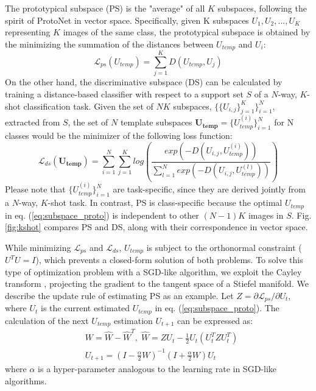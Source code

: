 The prototypical subspace (PS) is the "average" of all $K$ subspaces, following the spirit of ProtoNet \cite{snell2017prototypical} in vector space.
Specifically, given K subspaces $U_1,U_2,...,U_K$ representing $K$ images of the same class, the prototypical subspace is obtained by the minimizing the summation of the distances between $U_{temp}$ and $U_i$:
\begin{equation}
    \mathcal{L}_{ps}(U_{temp}) = \sum_{j=1}^K D(U_{temp},U_j)
\label{eq:subspace_proto}
\end{equation}
On the other hand, the discriminative subspace (DS) can be calculated by training a distance-based classifier with respect to a support set $S$ of a $N$-way, $K$-shot classification task.
Given the set of $NK$ subspaces, $\{\{U_{i, j} \}_{j=1}^{K} \}_{i=1}^N$, extracted from $S$, the set of $N$ template subspaces $\boldsymbol{U_{temp}}= \{U_{temp}^{(i)}\}_{i=1}^N$ for N classes would be the minimizer of the following loss function:
\begin{equation}
    \mathcal{L}_{ds}(\boldsymbol{U_{temp}}) = \sum_{i=1}^N \sum_{j=1}^K log \left( \frac{exp(-D(U_{i,j}, U_{temp}^{(i)}))}{\sum_{l=1}^N exp(-D(U_{i,j}, U_{temp}^{(l)}))} \right)
\label{eq:subspace_disc}
\end{equation}
Please note that $\{U_{temp}^{(i)}\}_{i=1}^N$ are task-specific, since they are derived jointly from a $N$-way, $K$-shot task.
In contrast, PS is class-specific because the optimal $U_{temp}$ in eq. (\ref{eq:subspace_proto}) is independent to other $(N-1)K$ images in $S$.
Fig. \ref{fig:kshot} compares PS and DS, along with their correspondence in vector space.

While minimizing $\mathcal{L}_{ps}$ and $\mathcal{L}_{ds}$, $U_{temp}$ is subject to the orthonormal constraint ($U^TU=I$), which prevents a closed-form solution of both problems.
To solve this type of optimization problem with a SGD-like algorithm, we exploit the Cayley transform \cite{nishimori2005learning}, projecting the gradient to the tangent space of a Stiefel manifold.
We describe the update rule of estimating PS as an example.
Let $Z=\partial \mathcal{L}_{ps}/ \partial U_t$, where $U_t$ is the current estimated $U_{temp}$ in eq. (\ref{eq:subspace_proto}).
The calculation of the next $U_{temp}$ estimation $U_{t+1}$ can be expressed as:
\begin{equation}
\begin{split}
    &W = \hat{W} - \hat{W}^T, \; \hat{W} = ZU_t - \frac{1}{2}U_t(U_t^TZU_t^T)\\
    &U_{t+1} = (I-\frac{\alpha}{2}W)^{-1}(I+\frac{\alpha}{2}W)U_{t}
\end{split}
\label{eq:cayley}
\end{equation}
where $\alpha$ is a hyper-parameter analogous to the learning rate in SGD-like algorithms.



